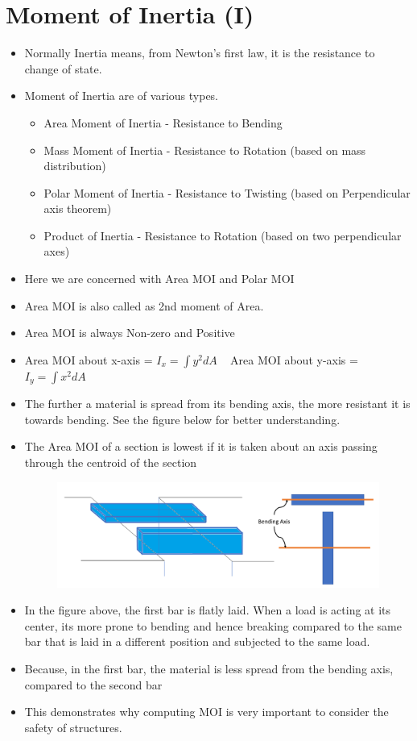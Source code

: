 \documentclass[8pt]{report}
\begin{document}
	\section{Moment of Inertia (I)}
		\begin{itemize}
			\item Normally Inertia means, from Newton's first law, it is the resistance to change  of state.
			\item Moment of Inertia are of various types.
				\begin{itemize}
					\item Area Moment of Inertia -  Resistance to Bending
					\item Mass Moment of Inertia - Resistance to Rotation (based on mass distribution)
					\item Polar Moment of Inertia - Resistance to Twisting (based on Perpendicular axis theorem)
					\item Product of Inertia - Resistance to Rotation (based on two perpendicular axes)
				\end{itemize}
			\item Here we are concerned with Area MOI and Polar MOI
			\item Area MOI is also called as 2nd moment of Area. 
			\item Area MOI is always Non-zero and Positive
			\item Area MOI about x-axis = $\boxed{I_{x} = \int y^2dA}\;\;\;$ Area MOI about y-axis = $\boxed{I_{y} = \int x^2dA}$
			\item The further a material is spread from its bending axis, the more resistant it is towards bending. See the figure below for better understanding.
			\item The Area MOI of a section is lowest if it is taken about an axis passing through the centroid of the section
			\begin{figure}[H]
				\centering
				\includegraphics[scale=0.4]{bending.png}
			\end{figure}
			\item In the figure above, the first bar is flatly laid. When a load is acting at its center, its more prone to bending and hence breaking compared to the same bar that is laid in a different position and subjected to the same load. 
			\item Because, in the first bar, the material is less spread from the bending axis, compared to the second bar
			\item This demonstrates why computing MOI is very important to consider the safety of structures. 
		\end{itemize}\hrulefill
\end{document}
